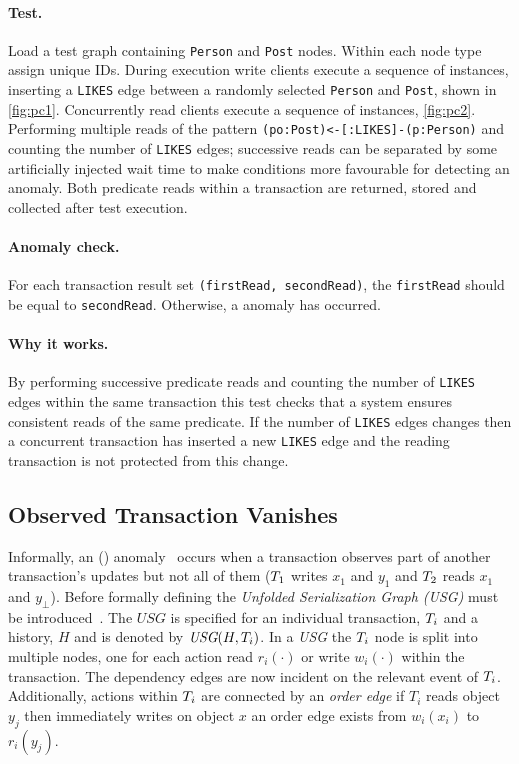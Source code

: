 \paragraph{Test.}
Load a test graph containing \texttt{Person} and \texttt{Post} nodes.
Within each node type assign unique IDs.
During execution write clients execute a sequence of  instances, inserting a \texttt{LIKES} edge between a randomly selected \texttt{Person} and \texttt{Post}, shown in \autoref{fig:pc1}.
Concurrently read clients execute a sequence of  instances, \autoref{fig:pc2}.
Performing multiple reads of the pattern \texttt{(po:Post)<-[:LIKES]-(p:Person)} and counting the number of \texttt{LIKES} edges; successive reads can be separated by some artificially injected wait time to make conditions more favourable for detecting an anomaly.
Both predicate reads within a  transaction are returned, stored and collected after test execution.

\paragraph{Anomaly check.}
For each  transaction result set \texttt{(firstRead, secondRead)}, the \texttt{firstRead} should be equal to \texttt{secondRead}.
Otherwise, a  anomaly has occurred.

\paragraph{Why it works.}
By performing successive predicate reads and counting the number of \texttt{LIKES} edges within the same transaction this test checks that a system ensures consistent reads of the same predicate.
If the number of \texttt{LIKES} edges changes then a concurrent transaction has inserted a new \texttt{LIKES} edge and the reading transaction is not protected from this change.

\subsection{Observed Transaction Vanishes}
\label{sec:observ-trans-vanish}
Informally, an  () anomaly~\cite{DBLP:journals/pvldb/BailisDFGHS13} occurs when a transaction observes part of another transaction's updates but not all of them (\eg $T_1$ writes $x_1$ and $y_1$ and $T_2$ reads $x_1$ and $y_\bot$).
Before formally defining  the \emph{Unfolded Serialization Graph (USG)} must be introduced~\cite{adya1999weak}.
The $\textit{USG}$ is specified for an individual transaction, $T_i$ and a history, $H$ and is denoted by $\textit{USG}(H,T_i)$.
In a \emph{USG} the $T_i$ node is split into multiple nodes, one for each action read $r_i(\cdot)$ or  write $w_i(\cdot)$  within the transaction.
The dependency edges are now incident on the relevant event of $T_i$.
Additionally, actions within $T_i$ are connected by  an \emph{order edge} \eg if $T_i$ reads object $y_j$ then immediately writes on object $x$ an order edge exists from $w_i(x_i)$ to $r_i(y_j)$.

